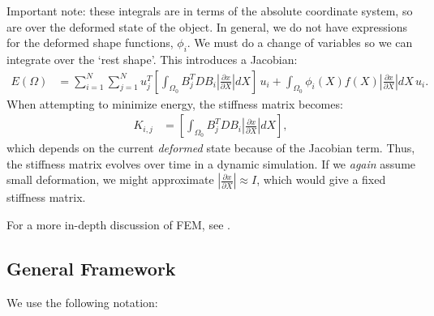 \documentclass[10pt]{article}
\newcommand{\di}[2]{\frac{\partial#1}{\partial#2}}
\begin{document}
Important note: these integrals are in terms of the absolute coordinate system, so are over the deformed state of the object.  
In general, we do not have expressions for the deformed shape functions, $\phi_i$.  We must do a change of variables so we
can integrate over the `rest shape'.  This introduces a Jacobian:
\begin{align}
  E(\Omega) & = \sum_{i=1}^N\sum_{j=1}^N u_j^T \left[\int_{\Omega_0} B_j^TDB_i \left|\di{x}{X}\right| dX\right]\, u_i + \int_{\Omega_0} \phi_i(X)f(X) \left|\di{x}{X}\right|dX\,u_i.
  \label{eq:strainenergy}
\end{align}
When attempting to minimize energy, the stiffness matrix becomes:
\begin{align}
 K_{i,j} & = \left[\int_{\Omega_0} B_j^TDB_i \left|\di{x}{X}\right| dX\right], \label{eq:stiffness}
\end{align}
which depends on the current \emph{deformed} state because of the Jacobian term.  Thus, the stiffness matrix evolves over time in 
a dynamic simulation.  If we \emph{again} assume small deformation, we might approximate $\left|\di{x}{X}\right|\approx I$, which would
give a fixed stiffness matrix.

For a more in-depth discussion of FEM, see \cite{bonet:2000:fem}.
 
\subsection{General Framework}

We use the following notation:
\smallskip
\end{document}
